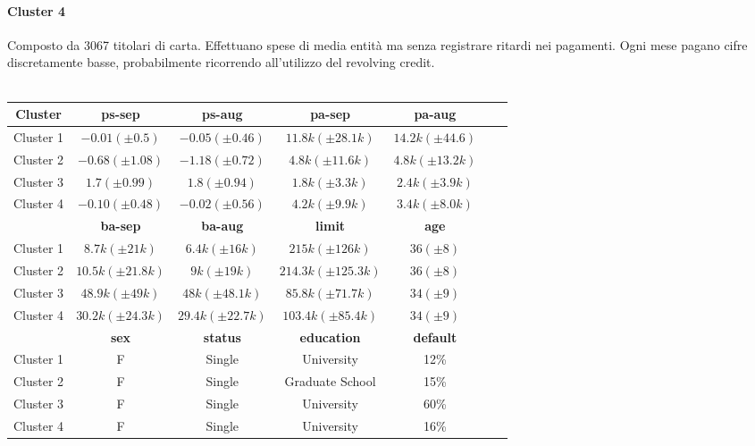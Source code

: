 \paragraph{Cluster 4}
Composto da 3067 titolari di carta. Effettuano spese di media entità ma senza registrare ritardi nei pagamenti. Ogni mese pagano cifre discretamente basse, probabilmente ricorrendo all'utilizzo del revolving credit.
\mbox{}\\
\mbox{}\\
\begin{center}
\begin{tabular}{c|c|c|c|c|c|c}
	\hline
	\textbf{Cluster} & \textbf{ps-sep} 
	& \textbf{ps-aug} & \textbf{pa-sep} 
	& \textbf{pa-aug}\\
	\hline
	Cluster 1 & 
	$ -0.01 (\pm 0.5)$ & 
	$ -0.05 (\pm 0.46)$ &
	$11.8k (\pm 28.1k)$ &
	$14.2k (\pm 44.6)$\\
	\hline
	Cluster 2 & 
	$-0.68 (\pm 1.08)$ & 
	$-1.18 (\pm 0.72)$ &
	$4.8k (\pm 11.6k)$ &
	$4.8k (\pm 13.2k)$\\
	\hline
	Cluster 3 & 
	$1.7 (\pm 0.99)$ & 
	$1.8 (\pm 0.94)$ &
	$1.8k (\pm 3.3k)$ &
	$2.4k (\pm 3.9k)$\\
	\hline
	Cluster 4 & 
	$-0.10 (\pm 0.48)$ & 
	$-0.02 (\pm 0.56)$ &
	$4.2k (\pm 9.9k)$ &
	$3.4k (\pm 8.0k)$\\
	\hline
	& 
	\textbf{ba-sep} & 
	\textbf{ba-aug} & 
	\textbf{limit} & 
	\textbf{age} &\\
	\hline
	Cluster 1 & 
	$8.7k (\pm 21k)$ &
	$6.4k (\pm 16k)$ &
	$215k (\pm 126k)$ &
	$36 (\pm 8)$\\
	\hline
	Cluster 2 &
	$10.5k (\pm 21.8k)$ &
	$9k (\pm 19k)$ &
	$214.3k (\pm 125.3k)$ &
	$36 (\pm 8)$\\
	\hline
	Cluster 3 &
	$48.9k (\pm 49k)$ &
	$48k (\pm 48.1k)$ &
	$85.8k (\pm 71.7k)$ &
	$34 (\pm 9)$\\
	\hline
	Cluster 4 &
	$30.2k (\pm 24.3k)$ &
	$29.4k (\pm 22.7k)$ &
	$103.4k (\pm 85.4k)$ &
	$34 (\pm 9)$\\
	\hline
	& 
	\textbf{sex} & 
	\textbf{status} & 
	\textbf{education} & 
	\textbf{default}\\
	\hline
	Cluster 1 & 
	F &
	Single &
	University&
	12\%\\
	\hline
	Cluster 2 & 
	F &
	Single &
	Graduate School&
	15\%\\
	\hline
	Cluster 3 & 
	F &
	Single &
	University&
	60\%\\
	\hline
	Cluster 4 & 
	F &
	Single &
	University&
	16\%\\
	\hline
\end{tabular}
\end{center}

